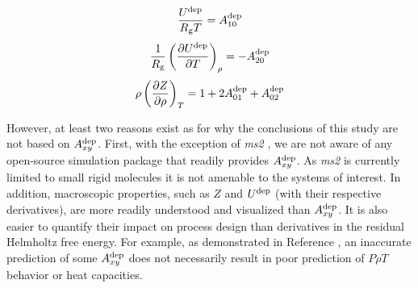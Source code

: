 \documentclass[preprint,letterpaper,floatfix,citeautoscript,aip,jcp]{revtex4-1}
\begin{document}
\begin{equation} \label{eq:U}
\frac{U^{\rm dep}}{R_{\rm g}T} = A_{10}^{\rm dep}
\end{equation}
\begin{equation} \label{eq:U_IC}
\frac{1}{R_{\rm g}} \left(\frac{\partial U^{\rm dep}}{\partial T}\right)_\rho = -A_{20}^{\rm dep} 
\end{equation} 
\begin{equation} \label{eq:Z_IT}
\rho \left(\frac{\partial Z}{\partial \rho}\right)_T = 1 + 2 A_{01}^{\rm dep} + A_{02}^{\rm dep} 
\end{equation}

However, at least two reasons exist as for why the conclusions of this study are not based on $A_{xy}^{\rm dep}$. First, with the exception of \textit{ms2} \cite{ms2}, we are not aware of any open-source simulation package that readily provides $A_{xy}^{\rm dep}$. As \textit{ms2} is currently limited to small rigid molecules it is not amenable to the systems of interest. In addition, macroscopic properties, such as $Z$ and $U^{\rm dep}$ (with their respective derivatives), are more readily understood and visualized than $A_{xy}^{\rm dep}$. It is also easier to quantify their impact on process design than derivatives in the residual Helmholtz free energy. For example, as demonstrated in 
Reference , an inaccurate prediction of some $A_{xy}^{\rm dep}$ does not necessarily result in poor prediction of $P \rho T$ behavior or heat capacities. 

\end{document}
